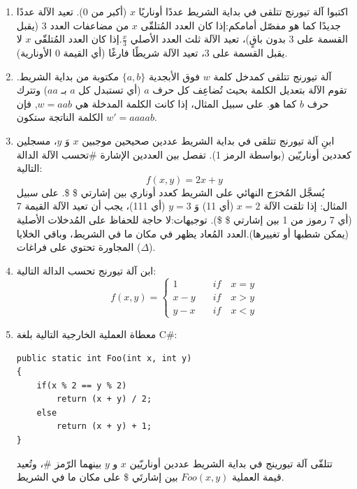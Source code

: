 \documentclass[14pt]{extarticle}
\begin{document}
    \begin{enumerate}
        \item
اكتبوا آلة تيورنج تتلقى في بداية الشريط عددًا أوناريًا $x$ (أكبر من 0). تعيد الآلة عددًا جديدًا كما هو مفصّل أمامكم:إذا كان العدد المُتلقّى $x$ من مضاعفات العدد 3 (يقبل القسمة على 3 بدون باقٍ)، تعيد الآلة ثلث العدد الأصلي $\frac{x}{3}$.إذا كان العدد المُتلقّى $x$ لا يقبل القسمة على 3، تعيد الآلة شريطًا فارغًا (أي القيمة 0 الأونارية).

\item
آلة تيورنج تتلقى كمدخل كلمة $w$ فوق الأبجدية $\{a, b\}$ مكتوبة من بداية الشريط.
تقوم الآلة بتعديل الكلمة بحيث تُضاعِف كل حرف $a$ (أي تستبدل كل $a$ بـ $aa$) وتترك حرف $b$ كما هو. على سبيل المثال، إذا كانت الكلمة المدخلة هي $w = aab$, فإن الكلمة الناتجة ستكون $w' = aaaab$.

\item
ابنِ آلة تيورنج تتلقى في بداية الشريط عددين صحيحين موجبين $x$ وَ $y$، مسجلين كعددين أوناريّين (بواسطة الرمز 1).
تفصل بين العددين الإشارة $\#$تحسب الآلة الدالة التالية:$$f(x, y) = 2x + y$$يُسجَّل المُخرَج النهائي على الشريط كعدد أوناري بين إشارتي \$ \$.
على سبيل المثال: إذا تلقت الآلة $x=2$ (أي 11) وَ $y=3$ (أي 111)، يجب أن تعيد الآلة القيمة 7 (أي 7 رموز من 1 بين إشارتي \$ \$).
توجيهات:لا حاجة للحفاظ على المُدخلات الأصلية (يمكن شطبها أو تغييرها).العدد المُعاد يظهر في مكان ما في الشريط، وباقي الخلايا المجاورة تحتوي على فراغات ($\Delta$).

\item ابن آلة تيورنج تحسب الدالة التالية:
\[
f(x, y) =
\begin{cases}
1 & \quad if \quad x = y \\
x-y & \quad if \quad x > y \\
y-x & \quad if \quad x < y
\end{cases}
\]

\item
معطاة العملية الخارجية التالية بلغة C\#:
\begin{boxCode}
\begin{english}
\begin{verbatim}
public static int Foo(int x, int y)
{
    if(x % 2 == y % 2)
        return (x + y) / 2;
    else
        return (x + y) + 1;
}
\end{verbatim}
\end{english}
\end{boxCode}

تتلقّى آلة تيورينج في بداية الشريط عددين أوناريّين $x$ و $y$ بينهما الرّمز \#،
وتُعيد قيمة العملية $Foo(x, y)$ بين إشارتَي \$ على مكان ما في الشريط.


\end{enumerate}
\end{document}
